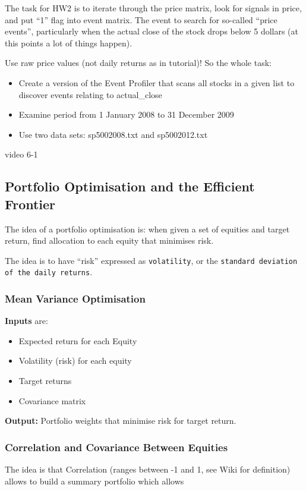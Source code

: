 \documentclass{scrartcl}
\newcommand{\term}[1]{\verb~#1~} %
\begin{document}
The task for HW2 is to iterate through the price matrix, look for signals in
price, and put ``1'' flag into event matrix. The event to search for so-called
``price events'', particularly when the actual close of the stock drops below 5
dollars (at this points a lot of things happen).

Use raw price values (not daily returns as in tutorial)! So the whole task:
\begin{itemize}
\item Create a version of the Event Profiler that scans all stocks in a given
  list to discover events relating to actual\_close
\item Examine period from 1 January 2008 to 31 December 2009
\item Use two data sets: sp5002008.txt and sp5002012.txt
\end{itemize}

video 6-1
\subsection{Portfolio Optimisation and the Efficient Frontier}
\label{sec:EfficientFrontier}
The idea of a portfolio optimisation is: when given a set of equities and target
return, find allocation to each equity that minimises risk.

The idea is to have ``risk'' expressed as \term{volatility}, or the
\term{standard deviation of the daily returns}.

\subsubsection{Mean Variance Optimisation}
\label{sec:MeanVarianceOptimisation}
{\bf Inputs} are:
\begin{itemize}
\item Expected return for each Equity
\item Volatility (risk) for each equity
\item Target returns 
\item Covariance matrix
\end{itemize}
{\bf Output:} Portfolio weights that minimise risk for target return.

\subsubsection{Correlation and Covariance Between Equities}
\label{sec:CorrelationAndCovariance}
The idea is that Correlation (ranges between -1 and 1, see Wiki for definition)
allows to build a summary portfolio which allows 
\end{document}
